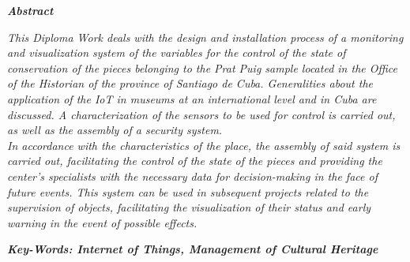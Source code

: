 \setcounter{page}{5}
\thispagestyle{plain}

    \textbf{\textit{\Large Abstract}}
    \newline

    \textit{This Diploma Work deals with the design and installation process of a monitoring and visualization system of the variables for the control of the state of conservation of the pieces belonging to the Prat Puig sample located in the Office of the Historian of the province of Santiago de Cuba. Generalities about the application of the IoT in museums at an international level and in Cuba are discussed. A characterization of the sensors to be used for control is carried out, as well as the assembly of a security system.\\
    In accordance with the characteristics of the place, the assembly of said system is carried out, facilitating the control of the state of the pieces and providing the center's specialists with the necessary data for decision-making in the face of future events. This system can be used in subsequent projects related to the supervision of objects, facilitating the visualization of their status and early warning in the event of possible effects.}


    \textbf{\textit{Key-Words: Internet of Things, Management of Cultural Heritage}} 